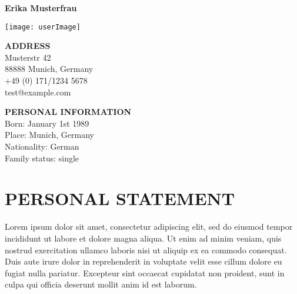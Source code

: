 \documentclass[twoside]{article}
\newcommand{\horizontalline}{
 \vspace{-6 mm}
\makebox[\linewidth]{\rule{0.8\paperwidth}{0.6pt}}
\newline
}
\begin{document}
\vspace{-3 mm}
\noindent
	\begin{minipage}[t][][t]{0.37\textwidth} %
\centerline{\huge \bf Erika Musterfrau }
	\end{minipage}
	\hfill
	\begin{minipage}[t]{0.4\textwidth}
	\hfill \texttt{[image: userImage]}
\end{minipage}
\newline
\makebox[\linewidth]{\rule{0.9\paperwidth}{1pt}}
\newline

\noindent
\begin{minipage}{0.5\textwidth}
\textbf{ADDRESS}\\ 
Musterstr 42\\
88888 Munich, Germany\\
+49 (0) 171/1234 5678\\
test@example.com 
\end{minipage} \hfill
\begin{minipage}{0.5\textwidth}
\flushright
\textbf{PERSONAL INFORMATION} \\ 
Born: January 1st 1989\\
Place:  Munich, Germany \\
Nationality: German \\
Family status: single\\
\end{minipage}

\section*{PERSONAL STATEMENT} 
\horizontalline
\newline
Lorem ipsum dolor sit amet, consectetur adipiscing elit, sed do eiusmod tempor incididunt ut labore et dolore magna aliqua. Ut enim ad minim veniam, quis nostrud exercitation ullamco laboris nisi ut aliquip ex ea commodo consequat. Duis aute irure dolor in reprehenderit in voluptate velit esse cillum dolore eu fugiat nulla pariatur. Excepteur sint occaecat cupidatat non proident, sunt in culpa qui officia deserunt mollit anim id est laborum.
\end{document}
